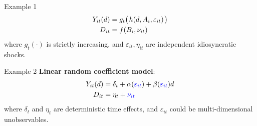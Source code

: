 \documentclass[aspectratio=1610, 9pt]{beamer}
\begin{document}
\begin{frame}{Example 1}
 \begin{align*}
     Y_{it}(d) & =g_t \big(\hspace{0.1em} h(d,A_i,\varepsilon_{it}) \hspace{0.1em}  \big)\\
D_{it}&=f(B_i,\nu_{it})
 \end{align*}
where $g_t(\cdot) $ is strictly increasing, and $\varepsilon_{it},\eta_{it}$ are independent idiosyncratic shocks.


\end{frame}

\begin{frame}{Example 2}
 \textbf{Linear random coefficient model}:
 \begin{align*}
     Y_{it}(d) & =\delta_t + \alpha(\textcolor{blue}{\varepsilon_{it}}) +\beta(\textcolor{blue}{\varepsilon_{it}}) d\\
D_{it}&=\eta_t+ \textcolor{blue}{\nu_{it}}
 \end{align*}
where $\delta_t$ and $\eta_t$ are deterministic time effects, and $\varepsilon_{it}$ could be multi-dimensional unobservables.


\end{frame}





   



\end{document}
